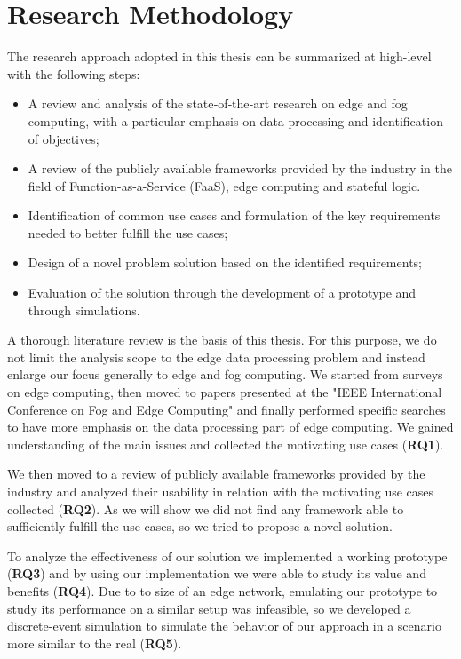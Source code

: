 \section{Research Methodology}
The research approach adopted in this thesis can be summarized at high-level with the following steps:
\begin{itemize}
    \item A review and analysis of the state‐of‐the‐art research on edge and fog computing, with a particular emphasis on data processing and identification of objectives;
    
    \item A review of the publicly available frameworks provided by the industry in the field of Function-as-a-Service (FaaS), edge computing and stateful logic. 
    
    \item Identification of common use cases and formulation of the key requirements needed to better fulfill the use cases;
    
    \item Design of a novel problem solution based on the identified requirements;
    
    \item Evaluation of the solution through the development of a prototype and through simulations.
\end{itemize}
A thorough literature review is the basis of this thesis. For this purpose, we do not limit the analysis scope to the edge data processing problem and instead enlarge our focus generally to edge and fog computing. We started from surveys on edge computing, then moved to papers presented at the "IEEE International Conference on Fog and Edge Computing" and finally performed specific searches to have more emphasis on the data processing part of edge computing.
We gained understanding of the main issues and collected the motivating use cases (\textbf{RQ1}).

We then moved to a review of publicly available frameworks provided by the industry and analyzed their usability in relation with the motivating use cases collected (\textbf{RQ2}). As we will show we did not find any framework able to sufficiently fulfill the use cases, so we tried to propose a novel solution.

To analyze the effectiveness of our solution we implemented a working prototype (\textbf{RQ3}) and by using our implementation we were able to study its value and benefits (\textbf{RQ4}). Due to to size of an edge network, emulating our prototype to study its performance on a similar setup was infeasible, so we developed a discrete-event simulation to simulate the behavior of our approach in a scenario more similar to the real (\textbf{RQ5}).

